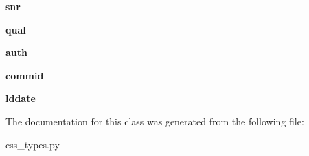 \begin{DoxyCompactItemize}
\item 
\hypertarget{classcss__types_1_1arrival30_a5d61671dba8b56fda81912d40607d8d2}{}{\bfseries snr}\label{classcss__types_1_1arrival30_a5d61671dba8b56fda81912d40607d8d2}

\item 
\hypertarget{classcss__types_1_1arrival30_a87b6304a9681c3f8a42b6e0872d25175}{}{\bfseries qual}\label{classcss__types_1_1arrival30_a87b6304a9681c3f8a42b6e0872d25175}

\item 
\hypertarget{classcss__types_1_1arrival30_a33bde0405d84f00048beecd9798cfb94}{}{\bfseries auth}\label{classcss__types_1_1arrival30_a33bde0405d84f00048beecd9798cfb94}

\item 
\hypertarget{classcss__types_1_1arrival30_a708b037a6770088a90d8485d8d59b22e}{}{\bfseries commid}\label{classcss__types_1_1arrival30_a708b037a6770088a90d8485d8d59b22e}

\item 
\hypertarget{classcss__types_1_1arrival30_a9a236eddb5b48eb184754600cda8a628}{}{\bfseries lddate}\label{classcss__types_1_1arrival30_a9a236eddb5b48eb184754600cda8a628}

\end{DoxyCompactItemize}


The documentation for this class was generated from the following file\+:\begin{DoxyCompactItemize}
\item 
css\+\_\+types.\+py\end{DoxyCompactItemize}
